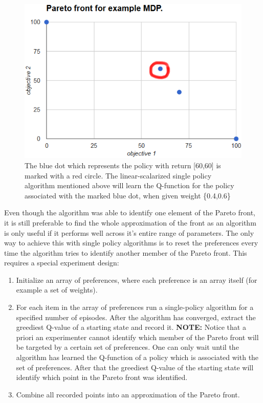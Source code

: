 \begin{figure}[ht]
\centering
\includegraphics[scale=0.6]{exampleMDPOneMarkedPolicy.png}
\caption{The blue dot which represents the policy with return [60,60] is marked with a red circle. The linear-scalarized single policy algorithm mentioned above will learn the Q-function for the policy associated with the marked blue dot, when given weight \{0.4,0.6\}}
\label{fig:exampleMDPOneMarkedPolicy}
\end{figure}

Even though the algorithm was able to identify one element of the Pareto front, it is still preferable to find the whole approximation of the front as an algorithm is only useful if it performs well across it's entire range of parameters. The only way to achieve this with single policy algorithms is to reset the preferences every time the algorithm tries to identify another member of the Pareto front. This requires a special experiment design:

\begin{enumerate}
  \item Initialize an array of preferences, where each preference is an array itself (for example a set of weights).
  \item For each item in the array of preferences run a single-policy algorithm for a specified number of episodes. After the algorithm has converged, extract the greediest Q-value of a starting state and record it. \textbf{NOTE:} Notice that a priori an experimenter cannot identify which member of the Pareto front will be targeted by a certain set of preferences. One can only wait until the algorithm has learned the Q-function of a policy which is associated with the set of preferences. After that the greediest Q-value of the starting state will identify which point in the Pareto front was identified.
  \item Combine all recorded points into an approximation of the Pareto front.
\end{enumerate}

